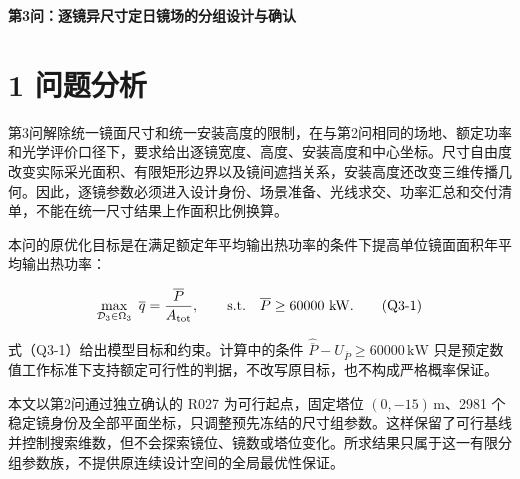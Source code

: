 \documentclass[UTF8,fontset=windows,zihao=-4]{ctexart}
\begin{document}
\begin{center}{\LARGE\bfseries 第3问：逐镜异尺寸定日镜场的分组设计与确认}\end{center}

\section*{1 问题分析}

第3问解除统一镜面尺寸和统一安装高度的限制，在与第2问相同的场地、额定功率和光学评价口径下，要求给出逐镜宽度、高度、安装高度和中心坐标。尺寸自由度改变实际采光面积、有限矩形边界以及镜间遮挡关系，安装高度还改变三维传播几何。因此，逐镜参数必须进入设计身份、场景准备、光线求交、功率汇总和交付清单，不能在统一尺寸结果上作面积比例换算。

\par\noindent\begin{minipage}{\linewidth}
本问的原优化目标是在满足额定年平均输出热功率的条件下提高单位镜面面积年平均输出热功率：

\[
\max_{\mathcal D_3\in\Omega_3}\ \overline q
=\frac{\overline P}{A_{\rm tot}},
\qquad
\text{s.t.}\quad \overline P\ge60000\ \mathrm{kW}.
\tag{Q3-1}
\]
\end{minipage}\par

式（Q3-1）给出模型目标和约束。计算中的条件 \(\widehat{\overline P}-U_{\overline P}\ge60000\,\mathrm{kW}\) 只是预定数值工作标准下支持额定可行性的判据，不改写原目标，也不构成严格概率保证。

本文以第2问通过独立确认的 R027 为可行起点，固定塔位 \((0,-15)\,\mathrm m\)、2981 个稳定镜身份及全部平面坐标，只调整预先冻结的尺寸组参数。这样保留了可行基线并控制搜索维数，但不会探索镜位、镜数或塔位变化。所求结果只属于这一有限分组参数族，不提供原连续设计空间的全局最优性保证。
\end{document}
